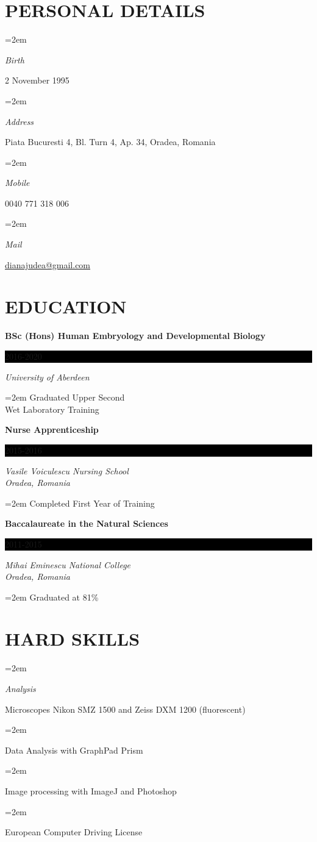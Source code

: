 \documentclass[paper=a4,fontsize=11pt]{scrartcl} %
\newlength{\spacebox}
\newcommand{\sepspace}{\vspace*{1em}}		%
\newcommand{\MyName}[1]{ %
  \Huge \usefont{OT1}{phv}{b}{n} \hfill #1
  \par \normalsize \normalfont}
\newcommand{\MySlogan}[1]{ %
		\large \usefont{OT1}{phv}{m}{n}\hfill \textit{#1}
		\par \normalsize \normalfont}
\newcommand{\NewPart}[1]{\section*{\uppercase{#1}}}
\newcommand{\PersonalEntry}[2]{
		\noindent\hangindent=2em\hangafter=0 %
		\parbox{\spacebox}{        %
		\textit{#1}}		       %
		\hspace{1.5em} #2 \par}    %
\newcommand{\SkillsEntry}[2]{      %
		\noindent\hangindent=2em\hangafter=0 %
		\parbox{\spacebox}{        %
		\textit{#1}}			   %
		\hspace{1.5em} \parbox{6\spacebox}{#2} \par}    %
\newcommand{\EducationEntry}[4]{
		\noindent \textbf{#1} \hfill      %
		\colorbox{Black}{%
			\parbox{6em}{%
			\hfill\color{White}#2}} \par  %
		\noindent \textit{#3} \par        %
		\noindent\hangindent=2em\hangafter=0 \small #4 %
		\normalsize \par}
\begin{document}
  \cleardoublepage
  




  \NewPart{Personal details}{}

  \PersonalEntry{Birth}{2 November 1995}
  \PersonalEntry{Address}{Piata Bucuresti 4, Bl. Turn 4, Ap. 34, Oradea, Romania}
  \PersonalEntry{Mobile}{0040 771 318 006}
  \PersonalEntry{Mail}{\url{dianajudea@gmail.com}}

  \NewPart{Education}{}

  \EducationEntry{BSc (Hons) Human Embryology and Developmental Biology}{2016-2020}{University of Aberdeen}{Graduated Upper Second \\ Wet Laboratory Training}

  \sepspace

  \EducationEntry{Nurse Apprenticeship}{2015-2016}{Vasile Voiculescu Nursing School \\ Oradea, Romania}{Completed First Year of Training}

  \sepspace

  \EducationEntry{Baccalaureate in the Natural Sciences}{2011-2015}{Mihai Eminescu National College \\ Oradea, Romania}{Graduated at 81\%}



  \NewPart{Hard Skills}{}

  \SkillsEntry{Analysis}{Microscopes Nikon SMZ 1500 and Zeiss DXM 1200 (fluorescent)}
  \SkillsEntry{}{Data Analysis with GraphPad Prism}
  \SkillsEntry{}{Image processing with ImageJ and Photoshop}
  \SkillsEntry{}{European Computer Driving License}
  \sepspace
\end{document}
